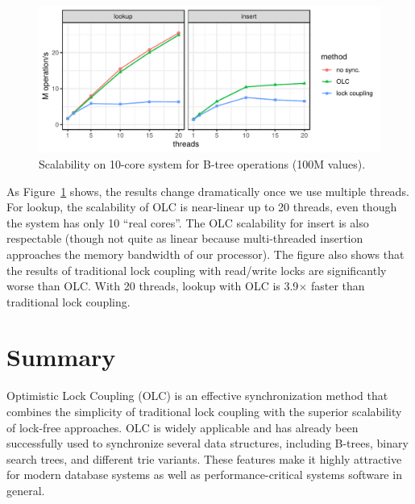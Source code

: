 \documentclass[11pt]{article}
\begin{document}
\begin{figure}
  \centering
  \includegraphics[width=\linewidth]{figs/scale.pdf}
  \vspace{0.2cm}
  \caption{Scalability on 10-core system for B-tree operations (100M values).}
  \label{fig:scale}
\end{figure}

As Figure~\ref{fig:scale} shows, the results change dramatically once we use multiple threads.
For lookup, the scalability of OLC is near-linear up to 20 threads, even though the system has only 10 ``real cores''.
The OLC scalability for insert is also respectable (though not quite as linear because multi-threaded insertion approaches the memory bandwidth of our processor).
The figure also shows that the results of traditional lock coupling with read/write locks are significantly worse than OLC.
With 20 threads, lookup with OLC is 3.9$\times$ faster than traditional lock coupling.

\section{Summary}\label{sec:conc}

Optimistic Lock Coupling (OLC) is an effective synchronization method that combines the simplicity of traditional lock coupling with the superior scalability of lock-free approaches.
OLC is widely applicable and has already been successfully used to synchronize several data structures, including B-trees, binary search trees, and different trie variants.
These features make it highly attractive for modern database systems as well as performance-critical systems software in general.
\end{document}
